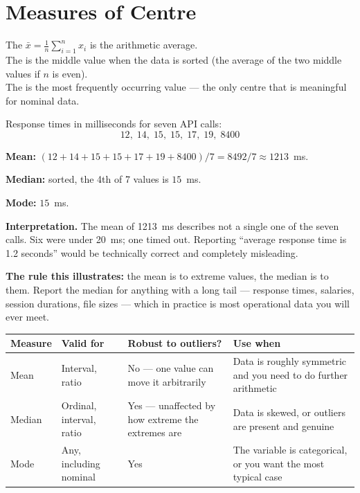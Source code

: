 \section{Measures of Centre}

\begin{definitionbox}
The  $\bar{x} = \frac{1}{n}\sum_{i=1}^{n} x_i$ is the arithmetic
average.\\[2pt]
The  is the middle value when the data is sorted (the average of the
two middle values if $n$ is even).\\[2pt]
The  is the most frequently occurring value --- the only centre that
is meaningful for nominal data.
\end{definitionbox}

\begin{worked}
Response times in milliseconds for seven API calls:
$$12,\; 14,\; 15,\; 15,\; 17,\; 19,\; 8400$$

\textbf{Mean:} $(12+14+15+15+17+19+8400)/7 = 8492/7 \approx 1213$~ms.

\textbf{Median:} sorted, the 4th of 7 values is $15$~ms.

\textbf{Mode:} $15$~ms.

\smallskip
\textbf{Interpretation.} The mean of 1213~ms describes not a single one of the
seven calls. Six were under 20~ms; one timed out. Reporting ``average response
time is 1.2 seconds'' would be technically correct and completely misleading.

\textbf{The rule this illustrates:} the mean is  to extreme
values, the median is  to them. Report the median for anything with a
long tail --- response times, salaries, session durations, file sizes --- which in
practice is most operational data you will ever meet.
\end{worked}

\begin{longtable}{@{}L{2.0cm}L{3.0cm}L{4.0cm}L{5.2cm}@{}}
\toprule
{}
\textbf{Measure} & \textbf{Valid for} & \textbf{Robust to outliers?} & \textbf{Use when} \\
\midrule
\endhead
Mean & Interval, ratio & No --- one value can move it arbitrarily & Data is roughly symmetric and you need to do further arithmetic \\
Median & Ordinal, interval, ratio & Yes --- unaffected by how extreme the extremes are & Data is skewed, or outliers are present and genuine \\
Mode & Any, including nominal & Yes & The variable is categorical, or you want the most typical case \\
\bottomrule
\end{longtable}

